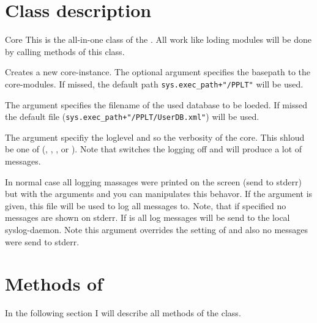 \section{Class description}
\begin{classdesc}{Core}{}
This is the all-in-one class of the . All work like loding 
modules will be done by calling methods of this class. 

Creates a new core-instance. The optional argument  specifies
the basepath to the core-modules. If missed, the default path 
\texttt{sys.exec\_path+"/PPLT"} will be used. 

The argument  specifies the filename of the used database to 
be loeded. If missed the default file 
(\texttt{sys.exec\_path+"/PPLT/UserDB.xml"}) will be used.


The argument  specifiy the loglevel and so the verbosity of the 
core. This shloud be one of (, , , 
 or ). Note that  switches the logging
off and  will produce a lot of messages. 

In normal case all logging massages were printed on the screen (send to 
stderr) but with the arguments  and  you can 
manipulates this behavor. If the argument  is given, this file 
will be used to log all messages to. Note, that if  specified no 
messages are shown on stderr. If  is  all log messages 
will be send to the local syslog-daemon. Note this argument overrides the 
setting of  and also no messages were send to stderr.
\end{classdesc}

\section{Methods of }
\label{core-objects}
In the following section I will describe all methods of the  
class. 


